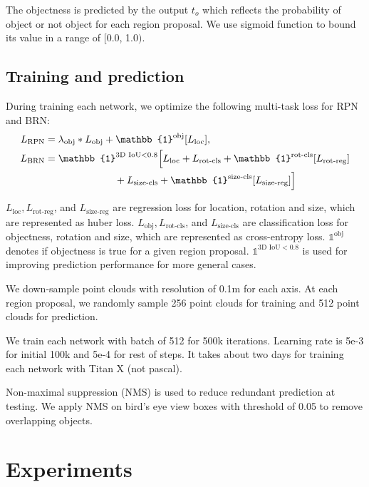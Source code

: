 \documentclass[letterpaper, 10 pt, conference]{ieeeconf}
\begin{document}
The objectness is predicted by the output $t_{o}$ which reflects the probability of object or not object for each region proposal. We use sigmoid function to bound its value in a range of [0.0, 1.0$)$.
\subsection{Training and prediction}
During training each network, we optimize the following multi-task loss for RPN and BRN:
\begin{align}
\label{eqn:loss}
\begin{split}
 L_{\text{RPN}} &= \lambda_{\text{obj}} * L_{\text{obj}} + \mathbb{1}^{\text{obj}} [L_{\text{loc}}],
\\
 L_{\text{BRN}} &= \mathbb{1}^{\text{3D IoU} < 0.8} \Bigl[ L_{\text{loc}} + L_{\text{rot-cls}} + \mathbb{1}^{\text{rot-cls}}[L_{\text{rot-reg}}]
 \\
 & \qquad \qquad \qquad \quad+ L_{\text{size-cls}} + \mathbb{1}^{\text{size-cls}}[L_{\text{size-reg}}] \Bigr]
\end{split}
\end{align}

$L_{\text{loc}}, L_{\text{rot-reg}}$, and $L_{\text{size-reg}}$ are regression loss for location, rotation and size, which are represented as huber loss. $L_{\text{obj}}, L_{\text{rot-cls}}$, and $L_{\text{size-cls}}$ are classification loss for objectness, rotation and size, which are represented as cross-entropy loss.  $\mathbb{1}^{\text{obj}}$ denotes if objectness is true for a given region proposal. $\mathbb{1}^{\text{3D IoU}<0.8}$ is used for improving prediction performance for more general cases.

We down-sample point clouds with resolution of 0.1m for each axis. At each region proposal, we randomly sample 256 point clouds for training and 512 point clouds for prediction.

We train each network with batch of 512 for 500k iterations. Learning rate is 5e-3 for initial 100k and 5e-4 for rest of steps. It takes about two days for training each network with Titan X (not pascal).

Non-maximal suppression (NMS) is used to reduce redundant prediction at testing. We apply NMS on bird's eye view boxes with threshold of 0.05 to remove overlapping objects.



\section{Experiments}
\end{document}
